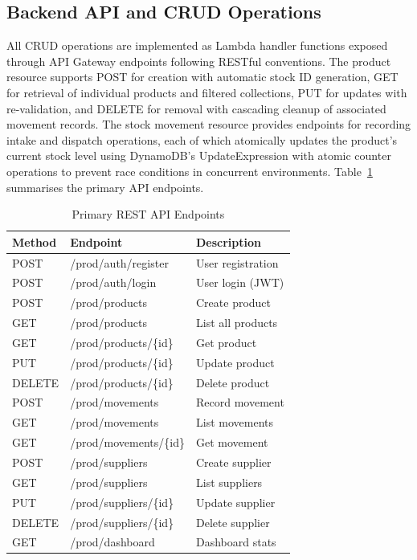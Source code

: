 \documentclass[conference]{IEEEtran}
\begin{document}
\subsection{Backend API and CRUD Operations}

All CRUD operations are implemented as Lambda handler functions exposed through API Gateway endpoints following RESTful conventions. The product resource supports POST for creation with automatic stock ID generation, GET for retrieval of individual products and filtered collections, PUT for updates with re-validation, and DELETE for removal with cascading cleanup of associated movement records. The stock movement resource provides endpoints for recording intake and dispatch operations, each of which atomically updates the product's current stock level using DynamoDB's UpdateExpression with atomic counter operations to prevent race conditions in concurrent environments. Table~\ref{tab:endpoints} summarises the primary API endpoints.

\begin{table}[H]
\centering
\caption{Primary REST API Endpoints}
\label{tab:endpoints}
\begin{tabular}{|l|l|l|}
\hline
\textbf{Method} & \textbf{Endpoint} & \textbf{Description} \\
\hline
POST & /prod/auth/register & User registration \\
POST & /prod/auth/login & User login (JWT) \\
\hline
POST & /prod/products & Create product \\
GET & /prod/products & List all products \\
GET & /prod/products/\{id\} & Get product \\
PUT & /prod/products/\{id\} & Update product \\
DELETE & /prod/products/\{id\} & Delete product \\
\hline
POST & /prod/movements & Record movement \\
GET & /prod/movements & List movements \\
GET & /prod/movements/\{id\} & Get movement \\
\hline
POST & /prod/suppliers & Create supplier \\
GET & /prod/suppliers & List suppliers \\
PUT & /prod/suppliers/\{id\} & Update supplier \\
DELETE & /prod/suppliers/\{id\} & Delete supplier \\
\hline
GET & /prod/dashboard & Dashboard stats \\
\hline
\end{tabular}
\end{table}
\end{document}
